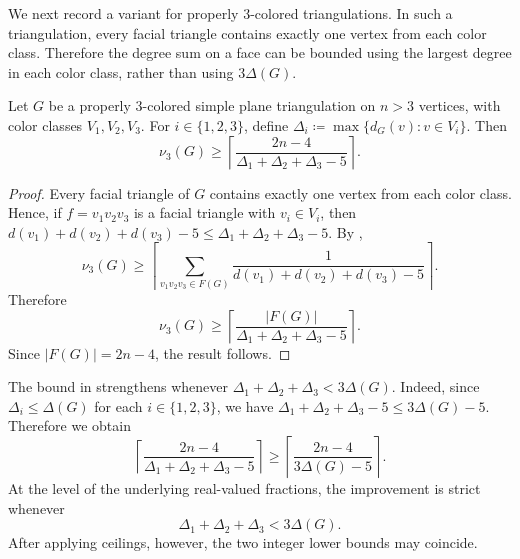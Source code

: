 \documentclass{patmorin}
\begin{document}
We next record a variant for properly $3$-colored triangulations. In such a triangulation, every facial triangle contains exactly one vertex from each color class. Therefore the degree sum on a face can be bounded using the largest degree in each color class, rather than using $3\Delta(G)$.

\begin{thm}\label{thm:colored-k3-packing}
Let $G$ be a properly $3$-colored simple plane triangulation on $n>3$
vertices, with color classes $V_1,V_2,V_3$. For $i\in\{1,2,3\}$, define $\Delta_i\coloneqq\max\{d_G(v):v\in V_i\}$.
Then
\[
\nu_3(G)\ge
\left\lceil
\frac{2n-4}{\Delta_1+\Delta_2+\Delta_3-5}
\right\rceil .
\]
\end{thm}

\begin{proof}
Every facial triangle of $G$ contains exactly one vertex from each color
class. Hence, if $f=v_1v_2v_3$ is a facial triangle with
$v_i\in V_i$, then $d(v_1)+d(v_2)+d(v_3)-5
\le
\Delta_1+\Delta_2+\Delta_3-5$.
By ,
\[
\nu_3(G)
\ge
\left\lceil
\sum_{v_1v_2v_3\in F(G)}
\frac{1}{d(v_1)+d(v_2)+d(v_3)-5}
\right\rceil .
\]
Therefore
\[
\nu_3(G)
\ge
\left\lceil
\frac{|F(G)|}{\Delta_1+\Delta_2+\Delta_3-5}
\right\rceil .
\]
Since $|F(G)|=2n-4$, the result follows.
\end{proof}

\begin{rmk}
The bound in  strengthens
 whenever $\Delta_1+\Delta_2+\Delta_3<3\Delta(G)$.
Indeed, since $\Delta_i\le \Delta(G)$ for each $i\in\{1,2,3\}$, we have $\Delta_1+\Delta_2+\Delta_3-5\le 3\Delta(G)-5$.
Therefore we obtain
\[
\left\lceil
\frac{2n-4}{\Delta_1+\Delta_2+\Delta_3-5}
\right\rceil
\ge
\left\lceil
\frac{2n-4}{3\Delta(G)-5}
\right\rceil .
\]
At the level of the underlying real-valued fractions, the improvement is
strict whenever
\[
\Delta_1+\Delta_2+\Delta_3<3\Delta(G).
\]
After applying ceilings, however, the two integer lower bounds may coincide.
\end{rmk}
\end{document}
